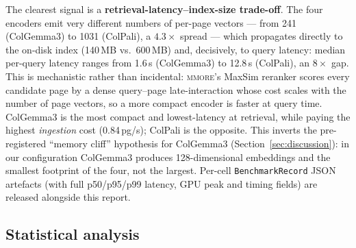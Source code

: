 \documentclass[10pt,a4paper]{article}
\begin{document}
\begin{table}[h]
  \centering
  \caption{Track A performance and footprint, tiny palier (709 pages),
    seed~0. Query latency measured over 32 queries on one 80\,GB-class GPU.}
  \label{tab:track_a_perf}
\end{table}

The clearest signal is a \textbf{retrieval-latency--index-size trade-off}.
The four encoders emit very different numbers of per-page vectors --- from
241 (ColGemma3) to 1031 (ColPali), a $4.3\times$ spread --- which propagates
directly to the on-disk index (140\,MB vs.\ 600\,MB) and, decisively, to
query latency: median per-query latency ranges from 1.6\,s (ColGemma3) to
12.8\,s (ColPali), an $8\times$ gap. This is mechanistic rather than
incidental: \textsc{mmore}'s MaxSim reranker scores every candidate page by a
dense query--page late-interaction whose cost scales with the number of page
vectors, so a more compact encoder is faster at query time. ColGemma3 is the
most compact and lowest-latency at retrieval, while paying the highest
\emph{ingestion} cost (0.84\,pg/s); ColPali is the opposite. This inverts the
pre-registered ``memory cliff'' hypothesis for ColGemma3
(Section~\ref{sec:discussion}): in our configuration ColGemma3 produces
128-dimensional embeddings and the smallest footprint of the four, not the
largest. Per-cell \texttt{BenchmarkRecord} JSON artefacts (with full
p50/p95/p99 latency, GPU peak and timing fields) are released alongside this
report.

\subsection{Statistical analysis}
\end{document}
